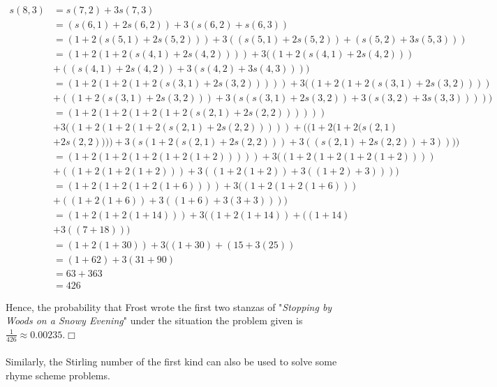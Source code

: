 \documentclass{article}
\theoremstyle{definition}
\theoremstyle{remark}
\theoremstyle{example}
\newcommand{\qedwhite}{\hfill \ensuremath{\Box}}
\begin{document}
\begin{align}
    s(8,3) &= s(7,2) + 3s(7,3)\\
    & = (s(6,1) + 2s(6,2)) + 3(s(6,2) + s(6,3))\\
    & = (1 + 2(s(5,1) + 2s(5,2))) + 3((s(5,1) + 2s(5,2)) + (s(5,2) + 3s(5,3)))\\
    & = (1 + 2(1 + 2(s(4,1) + 2s(4,2)))) + 3((1 + 2(s(4,1) + 2s(4,2))) \\
    & + ((s(4,1) + 2s(4,2)) + 3(s(4,2) + 3s(4,3))))\\
    & = (1 + 2(1 + 2(1 + 2(s(3,1) + 2s(3,2))))) + 3((1 + 2(1 + 2(s(3,1) + 2s(3,2)))) \\
    & + ((1 + 2(s(3,1) + 2s(3,2))) + 3(s(s(3,1) + 2s(3,2)) + 3(s(3,2) + 3s(3,3)))))\\
    & = (1 + 2(1 + 2(1 + 2(1 + 2(s(2,1) + 2s(2,2)))))) \\
    & + 3((1 + 2(1 + 2(1 + 2(s(2,1) + 2s(2,2))))) + ((1 + 2(1 + 2(s(2,1) \\
    &+ 2s(2,2)))) + 3(s(1 + 2(s(2,1) + 2s(2,2))) + 3((s(2,1) + 2s(2,2)) + 3))))\\
    & = (1 + 2(1 + 2(1 + 2(1 + 2(1 + 2))))) + 3((1 + 2(1 + 2(1 + 2(1 + 2)))) \\
    & + ((1 + 2(1 + 2(1 + 2))) + 3((1 + 2(1 + 2)) + 3((1 + 2) + 3))))\\
    & = (1 + 2(1 + 2(1 + 2(1 + 6)))) + 3((1 + 2(1 + 2(1 + 6))) \\
    & + ((1 + 2(1 + 6)) + 3((1 + 6) + 3(3 + 3))))\\
    & = (1 + 2(1 + 2(1 + 14))) + 3((1 + 2(1 + 14)) + ((1 + 14) \\
    & + 3((7 + 18)))\\
    & = (1 + 2(1 + 30)) + 3((1 + 30) + (15 + 3(25))\\
    & = (1 + 62) + 3(31 + 90)\\
    & = 63 + 363\\
    & = 426
\end{align}

Hence, the probability that Frost wrote the first two stanzas of "\textit{Stopping by Woods on a Snowy Evening}" under the situation the problem given is $\tfrac{1}{426} \approx 0.00235$.\qedwhite

\paragraph{  }

Similarly, the Stirling number of the first kind can also be used to solve some rhyme scheme problems.
\end{document}
